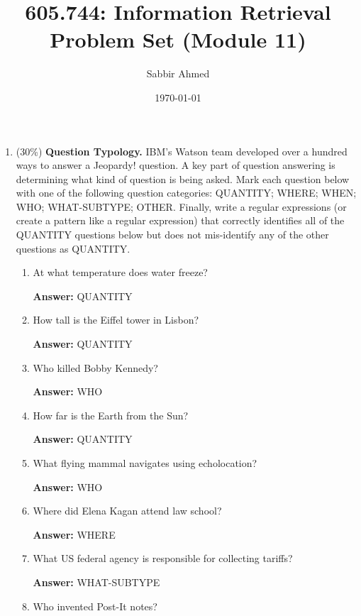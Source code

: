 \documentclass[11pt]{article}
\title{605.744: Information Retrieval \\ Problem Set (Module 11)}
\author{Sabbir Ahmed}
\date{\today}
\begin{document}
\maketitle

\begin{enumerate}

  \item (30\%) \textbf{Question Typology.} IBM's Watson team developed over a hundred ways to answer a Jeopardy! question. A key part of question answering is determining what kind of question is being asked. Mark each question below with one of the following question categories: QUANTITY; WHERE; WHEN; WHO; WHAT-SUBTYPE; OTHER. Finally, write a regular expressions (or create a pattern like a regular expression) that correctly identifies all of the QUANTITY questions below but does not mis-identify any of the other questions as QUANTITY.

        \begin{enumerate}
          \item At what temperature does water freeze?

                \textbf{Answer:} QUANTITY

          \item How tall is the Eiffel tower in Lisbon?

                \textbf{Answer:} QUANTITY

          \item Who killed Bobby Kennedy?

                \textbf{Answer:} WHO

          \item How far is the Earth from the Sun?

                \textbf{Answer:} QUANTITY

          \item What flying mammal navigates using echolocation?

                \textbf{Answer:} WHO

          \item Where did Elena Kagan attend law school?

                \textbf{Answer:} WHERE

          \item What US federal agency is responsible for collecting tariffs?

                \textbf{Answer:} WHAT-SUBTYPE

          \item Who invented Post-It notes?


\end{enumerate}
\end{enumerate}
\end{document}

